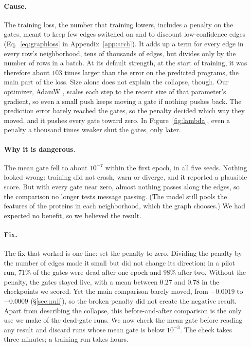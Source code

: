 \documentclass{article}
\begin{document}
\paragraph{Cause.} The training loss, the number that training lowers, includes a penalty on the gates,
meant to keep few edges switched on and to discount low-confidence edges (Eq.~\ref{eq:graphloss} in
Appendix~\ref{app:arch}). It adds up a term for every edge in every row's neighborhood, tens of thousands
of edges, but divides only by the number of rows in a batch. At its default strength, at the start of
training, it was therefore about $103$ times larger than the error on the predicted programs, the main part
of the loss. Size alone does not explain the collapse, though. Our optimizer, AdamW
\citep{loshchilov2019adamw}, scales each step to the recent size of that parameter's gradient, so even a
small push keeps moving a gate if nothing pushes back. The prediction error barely reached the gates, so
the penalty decided which way they moved, and it pushes every gate toward zero. In Figure~\ref{fig:lambda}, even a penalty a
thousand times weaker shut the gates, only later.

\paragraph{Why it is dangerous.} The mean gate fell to about $10^{-7}$ within the first epoch, in all five
seeds. Nothing looked wrong: training did not crash, warn or diverge, and it reported a plausible score.
But with every gate near zero, almost nothing passes along the edges, so the comparison no longer tests
message passing. (The model still pools the features of the proteins in each neighborhood, which the
graph chooses.) We had expected no benefit, so we believed the result.

\paragraph{Fix.} The fix that worked is one line: set the penalty to zero. Dividing the penalty by the
number of edges made it small but did not change its direction: in a pilot run, $71\%$ of the gates were
dead after one epoch and $98\%$ after two. Without the penalty, the gates stayed live, with a mean between
$0.27$ and $0.78$ in the checkpoints we scored. Yet the main comparison barely moved, from $-0.0019$ to
$-0.0009$ (\S\ref{sec:null}), so the broken penalty did not create the negative result. Apart from
describing the collapse, this before-and-after comparison is the only use we make of the dead-gate runs. We now check the mean gate
before reading any result and discard runs whose mean gate is below $10^{-3}$. The check takes three
minutes; a training run takes hours.
\end{document}

